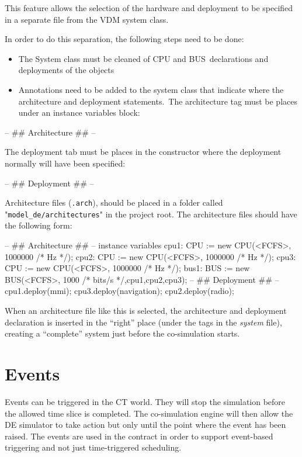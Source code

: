 \documentclass{crescendorepchap}
\begin{document}
This feature allows the selection of the hardware and deployment to be
specified in a separate file from the VDM system class.

In order to do this separation, the following steps need to be done:

\begin{itemize}
\item
  The System class must be cleaned of CPU and BUS~declarations and
  deployments of the objects
\item
  Annotations need to be added to the system class that indicate where
  the architecture and deployment statements.~The architecture tag must
  be places under an instance variables block:
\end{itemize}

\begin{vdmrt}
-- ## Architecture ## -- 
\end{vdmrt}

The deployment tab must be places in the constructor where the
deployment normally will have been specified:

\begin{vdmrt}
-- ## Deployment ## -- 
\end{vdmrt}

Architecture files (\texttt{.arch}), should be placed in a folder called
"\texttt{model\_de/architectures}" in the project root. The
architecture files should have the following form:

\begin{vdmrt}
-- ## Architecture ## --
instance variables
cpu1: CPU := new CPU(<FCFS>, 1000000 /* Hz */);
cpu2: CPU := new CPU(<FCFS>, 1000000 /* Hz */);
cpu3: CPU := new CPU(<FCFS>, 1000000 /* Hz */);
bus1: BUS := new BUS(<FCFS>, 1000 /* bits/s */,{cpu1,cpu2,cpu3});
-- ## Deployment ## --
cpu1.deploy(mmi);
cpu3.deploy(navigation);
cpu2.deploy(radio);
\end{vdmrt}

When an architecture file like this is selected, the architecture and
deployment declaration is inserted in the ``right'' place (under the
tags in the \emph{system} file), creating a ``complete'' system just
before the co-simulation starts.

\section{Events}

Events can be triggered in the CT world. They will stop the simulation
before the allowed time slice is completed. The co-simulation engine
will then allow the DE simulator to take action but only until the point
where the event has been raised. The events are used in the contract in
order to support event-based triggering and not just time-triggered
scheduling.
\end{document}
